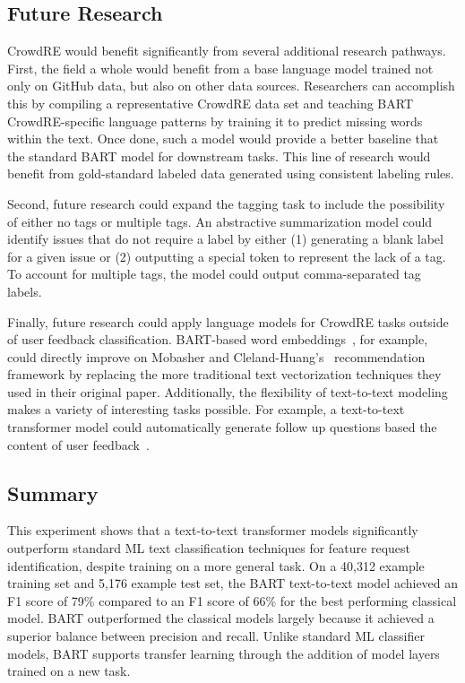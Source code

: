 \subsection{Future Research}

CrowdRE would benefit significantly from several additional research pathways. First, the field a whole would benefit from a base language model trained not only on GitHub data, but also on other data sources. Researchers can accomplish this by compiling a representative CrowdRE data set and teaching BART CrowdRE-specific language patterns by training it to predict missing words within the text. Once done, such a model would provide a better baseline that the standard BART model for downstream tasks. This line of research would benefit from gold-standard labeled data generated using consistent labeling rules.

Second, future research could expand the tagging task to include the possibility of either no tags or multiple tags. An abstractive summarization model could identify issues that do not require a label by either (1) generating a blank label for a given issue or (2) outputting a special token to represent the lack of a tag. To account for multiple tags, the model could output comma-separated tag labels. 

Finally, future research could apply language models for CrowdRE tasks outside of user feedback classification. BART-based word embeddings~\cite{kaliyar}, for example, could directly improve on Mobasher and Cleland-Huang's~\cite{mobasher} recommendation framework by replacing the more traditional text vectorization techniques they used in their original paper. Additionally, the flexibility of text-to-text modeling makes a variety of interesting tasks possible. For example, a text-to-text transformer model could automatically generate follow up questions based the content of user feedback~\cite{narayan}.

\subsection{Summary}

This experiment shows that a text-to-text transformer models significantly outperform standard ML text classification techniques for feature request identification, despite training on a more general task. On a 40,312 example training set and 5,176 example test set, the BART text-to-text model achieved an F1 score of 79\% compared to an F1 score of 66\% for the best performing classical model. BART outperformed the classical models largely because it achieved a superior balance between precision and recall. Unlike standard ML classifier models, BART supports transfer learning through the addition of model layers trained on a new task. 

